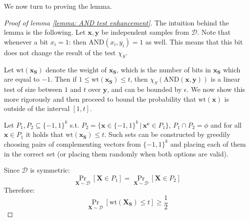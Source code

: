 \documentclass[12pt]{article}
\newcommand{\oo}[1]{\{-1,1\}^{#1}}
\newcommand{\dist}{\mathcal{D}}
\newcommand{\AND}{\mathrm{AND} }
\renewcommand{\vec}[1]{\bm{#1}}
\newcommand{\wt}[1]{\mathrm{wt}\left(#1\right)}
\begin{document}
	We now turn to proving the lemma.
	\begin{proof}[Proof of lemma \ref{lemma: AND test enhancement}]
		
		The intuition behind the lemma is the following.
		Let $\vec{x}, \vec{y}$ be independent samples from $\dist$.
		Note that whenever a bit $x_i = 1$: then $\AND(x_i, y_i) = 1$ as well.
		This means that this bit does not change the result of the test $\chi_S$.
		
		Let $\wt{\vec{x_S}}$ denote the weight of $\vec{x_S}$, which is the number of bits in $\vec{x_S}$ which are equal to $-1$.
		Then if $1 \leq \wt{ \vec{x_S}} \leq t$, then $\chi_S(\AND(\vec{x}, \vec{y}))$ is a linear test of size between $1$ and $t$ over $\vec{y}$, and can be bounded by $\epsilon$.
		We now show this more rigorously and then proceed to bound the probability that $\wt{\vec{x}}$ is outside of the interval $\left[1,t\right]$.
		
		Let $P_1,P_2 \subseteq \{-1,1\}^k$ s.t. $P_2 = \{ \vec{x} \in \oo{k} \, \vert \, \vec{x^c} \in P_1 \}$, $P_1 \cap P_2 = \phi$ and for all $\vec{x} \in P_1$ it holds that $\wt{\vec{x_S}} \leq t$. Such sets can be constructed by greedily choosing pairs of complementing vectors from $\{-1,1\}^k$ and placing each of them in the correct set (or placing them randomly when both options are valid).
		
		Since $\dist$ is symmetric:
		\begin{equation*}
			\Pr_{\vec{X} \sim \dist} \left[ \vec{X} \in P_1 \right] = \Pr_{\vec{X} \sim \dist} \left[ \vec{X} \in P_2 \right]
		\end{equation*}
		Therefore:
		\begin{equation*}
		 \Pr_{\vec{X} \sim \dist} \left[ \wt{\vec{X_S}} \leq t \right] \geq \frac{1}{2}
		\end{equation*}
		

\end{proof}
\end{document}

